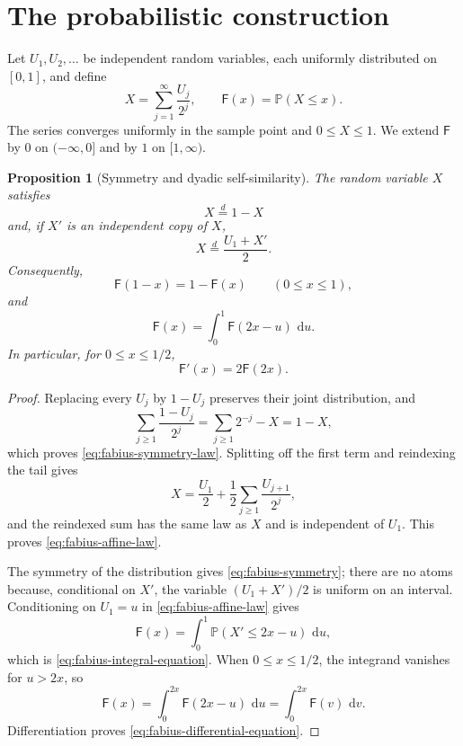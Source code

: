 \documentclass[11pt,oneside,openany]{book}
\newtheorem{proposition}[theorem]{Proposition}
\theoremstyle{definition}
\theoremstyle{remark}
\newcommand{\dd}{\,\mathrm d}
\newcommand{\Prob}{\mathbb P}
\newcommand{\Fab}{\mathsf F}
\begin{document}
\section{The probabilistic construction}

Let $U_1,U_2,\ldots$ be independent random variables, each uniformly
distributed on $[0,1]$, and define
\begin{equation}\label{eq:fabius-X}
 X=\sum_{j=1}^{\infty}\frac{U_j}{2^j},
 \qquad
 \Fab(x)=\Prob(X\le x).
\end{equation}
The series converges uniformly in the sample point and $0\le X\le1$.
We extend $\Fab$ by $0$ on $(-\infty,0]$ and by $1$ on $[1,\infty)$.

\begin{proposition}[Symmetry and dyadic self-similarity]\label{prop:fabius-self-similarity}
The random variable $X$ satisfies
\begin{equation}\label{eq:fabius-symmetry-law}
 X\overset d=1-X
\end{equation}
and, if $X'$ is an independent copy of $X$,
\begin{equation}\label{eq:fabius-affine-law}
 X\overset d=\frac{U_1+X'}2.
\end{equation}
Consequently,
\begin{equation}\label{eq:fabius-symmetry}
 \Fab(1-x)=1-\Fab(x)\qquad(0\le x\le1),
\end{equation}
and
\begin{equation}\label{eq:fabius-integral-equation}
 \Fab(x)=\int_0^1\Fab(2x-u)\,\dd u.
\end{equation}
In particular, for $0\le x\le1/2$,
\begin{equation}\label{eq:fabius-differential-equation}
 \Fab'(x)=2\Fab(2x).
\end{equation}
\end{proposition}

\begin{proof}
Replacing every $U_j$ by $1-U_j$ preserves their joint distribution, and
\[
 \sum_{j\ge1}\frac{1-U_j}{2^j}
 =\sum_{j\ge1}2^{-j}-X=1-X,
\]
which proves \eqref{eq:fabius-symmetry-law}.  Splitting off the first term and
reindexing the tail gives
\[
 X=\frac{U_1}{2}+\frac12\sum_{j\ge1}\frac{U_{j+1}}{2^j},
\]
and the reindexed sum has the same law as $X$ and is independent of $U_1$.
This proves \eqref{eq:fabius-affine-law}.

The symmetry of the distribution gives \eqref{eq:fabius-symmetry}; there are
no atoms because, conditional on $X'$, the variable $(U_1+X')/2$ is uniform
on an interval.  Conditioning on $U_1=u$ in
\eqref{eq:fabius-affine-law} gives
\[
 \Fab(x)=\int_0^1\Prob(X'\le2x-u)\,\dd u,
\]
which is \eqref{eq:fabius-integral-equation}.  When $0\le x\le1/2$, the
integrand vanishes for $u>2x$, so
\[
 \Fab(x)=\int_0^{2x}\Fab(2x-u)\,\dd u
        =\int_0^{2x}\Fab(v)\,\dd v.
\]
Differentiation proves \eqref{eq:fabius-differential-equation}.
\end{proof}
\end{document}
